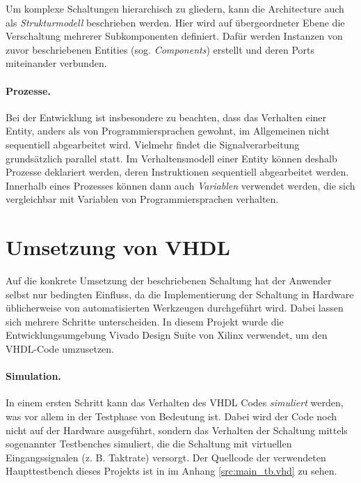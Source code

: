 Um komplexe Schaltungen hierarchisch zu gliedern, kann die Architecture auch als \emph{Strukturmodell} beschrieben werden. Hier wird auf übergeordneter Ebene die Verschaltung mehrerer Subkomponenten definiert. Dafür werden Instanzen von zuvor beschriebenen Entities (sog. \textit{Components}) erstellt und deren Ports miteinander verbunden. \cite[S. 25ff.]{kesel2013entwurf}

\paragraph{Prozesse.} Bei der Entwicklung ist insbesondere zu beachten, dass das Verhalten einer Entity, anders als von Programmiersprachen gewohnt, im Allgemeinen nicht sequentiell abgearbeitet wird. Vielmehr findet die Signalverarbeitung grundsätzlich parallel statt. Im Verhaltensmodell einer Entity können deshalb Prozesse deklariert werden, deren Instruktionen sequentiell abgearbeitet werden. Innerhalb eines Prozesses können dann auch \textit{Variablen} verwendet werden, die sich vergleichbar mit Variablen von Programmiersprachen verhalten. \cite[S. 29f.]{kesel2013entwurf}
 
\section{Umsetzung von VHDL}
Auf die konkrete Umsetzung der beschriebenen Schaltung hat der Anwender selbst nur bedingten Einfluss, da die Implementierung der Schaltung in Hardware üblicherweise von automatisierten Werkzeugen durchgeführt wird. Dabei lassen sich mehrere Schritte unterscheiden. In diesem Projekt wurde die Entwicklungsumgebung Vivado Design Suite von Xilinx verwendet, um den VHDL-Code umzusetzen.

\paragraph{Simulation.} In einem ersten Schritt kann das Verhalten des VHDL Codes \emph{simuliert} werden, was vor allem in der Testphase von Bedeutung ist. Dabei wird der Code noch nicht auf der Hardware ausgeführt, sondern das Verhalten der Schaltung mittels sogenannter Testbenches simuliert, die die Schaltung mit virtuellen Eingangssignalen (z. B. Taktrate) versorgt. \cite[S. 81]{SynthesisFPGA} Der Quellcode der verwendeten Haupttestbench dieses Projekts ist in im Anhang \ref{src:main_tb.vhd} zu sehen. 

